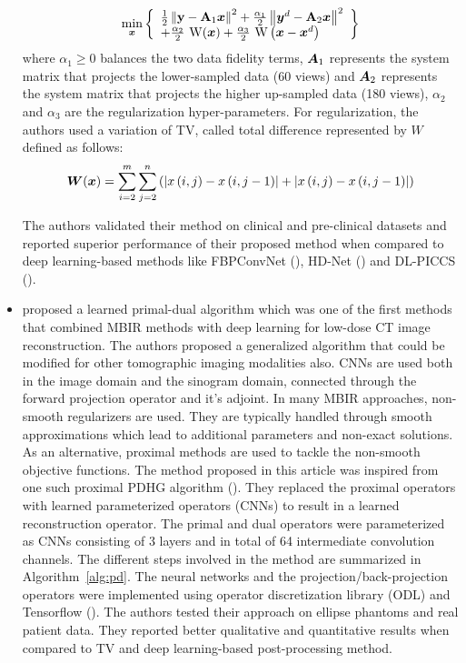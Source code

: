 \begin{itemize}
\begin{equation}\label{eq:cs}
\min _{\bm{x}}\left\{\begin{array}{l}
\frac{1}{2}\left\|\mathbf{y}-\mathbf{A}_{1} \bm{x} \right\|^{2}+\frac{\alpha_{1}}{2}\left\|\bm{y}^{d}-\mathbf{A}_{2} \bm{x}\right\|^{2} \\
+\frac{\alpha_{2}}{2} \mathrm{~W}(\bm{x}) +\frac{\alpha_{3}}{2} \mathrm{~W}\left(\bm{x}-\bm{x}^{d}\right)
\end{array}\right\}
\end{equation}
where $\alpha_{1} \ge 0$ balances the two data fidelity terms, $\bm{A}_{1}$ represents the system matrix that projects the lower-sampled data (60 views) and $\bm{A}_{2}$ represents the system matrix that projects the higher up-sampled data (180 views), $\alpha_{2}$ and $\alpha_{3}$ are the regularization hyper-parameters. For regularization, the authors used a variation of TV, called total difference represented by $W$ defined as follows:  
\begin{equation}
\bm{W} (\bm{x})=\sum_{i=2}^{m} \sum_{j=2}^{n}\left(\left|x\left(i,j\right)-x\left(i,j-1\right)\right|+\left|x\left(i, j\right)-x\left(i,j-1\right)\right|\right)
\end{equation}

The authors validated their method on clinical and pre-clinical datasets and reported superior performance of their proposed method when compared to deep learning-based methods like FBPConvNet (\cite{jin2017deep}), HD-Net (\cite{wu2020high}) and DL-PICCS (\cite{zhang2020deep}).

\item \cite{adler2018learned} proposed a learned primal-dual algorithm which was one of the first methods that combined \ac{MBIR} methods with deep learning for low-dose \ac{CT} image reconstruction. The authors proposed a generalized algorithm that could be modified for other tomographic imaging modalities also. \acp{CNN} are used both in the image domain and the sinogram domain, connected through the forward projection operator and it's adjoint. In many \ac{MBIR} approaches, non-smooth regularizers are used. They are typically handled through smooth approximations which lead to additional parameters and non-exact solutions. As an alternative, proximal methods are used to tackle the non-smooth objective functions. The method proposed in this article was inspired from one such proximal \ac{PDHG} algorithm (\cite{chambolle2011first}). They replaced the proximal operators with learned parameterized operators (\acp{CNN}) to result in a learned reconstruction operator. The primal and dual operators were parameterized as \acp{CNN} consisting of 3 layers and in total of 64 intermediate convolution channels. The different steps involved in the method are summarized in Algorithm~\ref{alg:pd}. The neural networks and the projection/back-projection operators were implemented using operator discretization library (ODL) and Tensorflow (\cite{abadi2016tensorflow}). The authors tested their approach on ellipse phantoms and real patient data. They reported better qualitative and quantitative results when compared to TV and deep learning-based post-processing method. 


\end{itemize}
